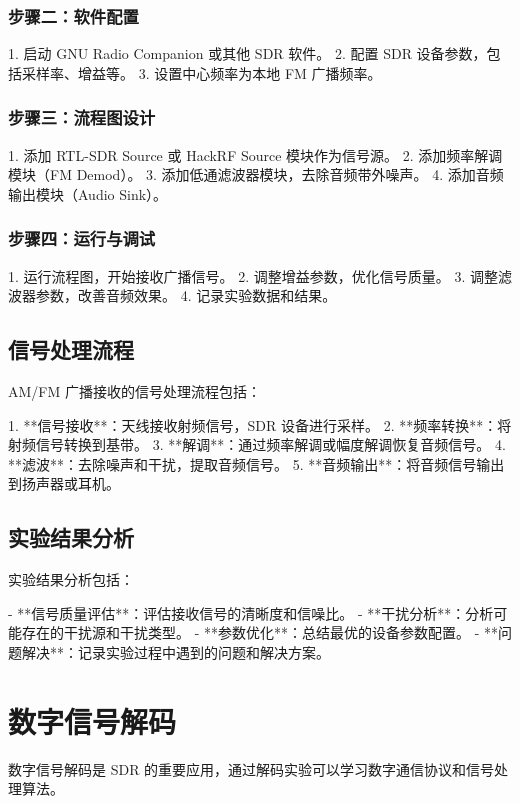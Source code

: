 \documentclass[UTF8]{ctexbook}
\begin{document}
\subsubsection{步骤二：软件配置}

1. 启动 GNU Radio Companion 或其他 SDR 软件。
2. 配置 SDR 设备参数，包括采样率、增益等。
3. 设置中心频率为本地 FM 广播频率。

\subsubsection{步骤三：流程图设计}

1. 添加 RTL-SDR Source 或 HackRF Source 模块作为信号源。
2. 添加频率解调模块（FM Demod）。
3. 添加低通滤波器模块，去除音频带外噪声。
4. 添加音频输出模块（Audio Sink）。

\subsubsection{步骤四：运行与调试}

1. 运行流程图，开始接收广播信号。
2. 调整增益参数，优化信号质量。
3. 调整滤波器参数，改善音频效果。
4. 记录实验数据和结果。

\subsection{信号处理流程}

AM/FM 广播接收的信号处理流程包括：

1. **信号接收**：天线接收射频信号，SDR 设备进行采样。
2. **频率转换**：将射频信号转换到基带。
3. **解调**：通过频率解调或幅度解调恢复音频信号。
4. **滤波**：去除噪声和干扰，提取音频信号。
5. **音频输出**：将音频信号输出到扬声器或耳机。

\subsection{实验结果分析}

实验结果分析包括：

- **信号质量评估**：评估接收信号的清晰度和信噪比。
- **干扰分析**：分析可能存在的干扰源和干扰类型。
- **参数优化**：总结最优的设备参数配置。
- **问题解决**：记录实验过程中遇到的问题和解决方案。

\section{数字信号解码}

数字信号解码是 SDR 的重要应用，通过解码实验可以学习数字通信协议和信号处理算法。
\end{document}
